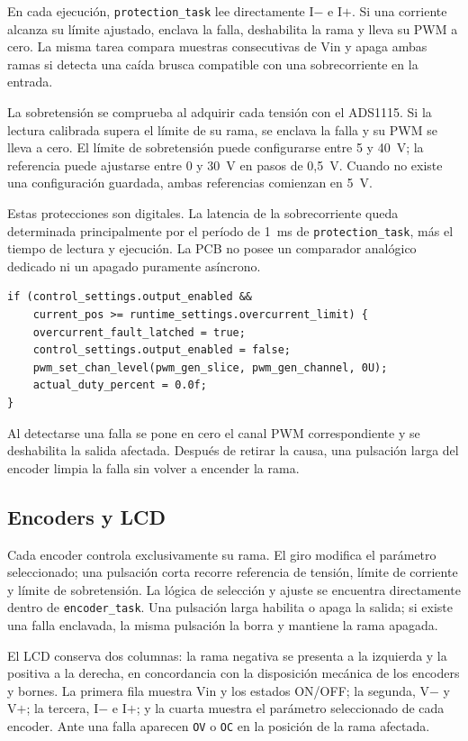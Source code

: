 \documentclass[conference]{IEEEtran}
\begin{document}
En cada ejecución, \texttt{protection\_task} lee directamente I$-$ e I$+$. Si una corriente alcanza su límite ajustado, enclava la falla, deshabilita la rama y lleva su PWM a cero. La misma tarea compara muestras consecutivas de Vin y apaga ambas ramas si detecta una caída brusca compatible con una sobrecorriente en la entrada.

La sobretensión se comprueba al adquirir cada tensión con el ADS1115. Si la lectura calibrada supera el límite de su rama, se enclava la falla y su PWM se lleva a cero. El límite de sobretensión puede configurarse entre 5 y 40~V; la referencia puede ajustarse entre 0 y 30~V en pasos de 0,5~V. Cuando no existe una configuración guardada, ambas referencias comienzan en 5~V.

Estas protecciones son digitales. La latencia de la sobrecorriente queda determinada principalmente por el período de 1~ms de \texttt{protection\_task}, más el tiempo de lectura y ejecución. La PCB no posee un comparador analógico dedicado ni un apagado puramente asíncrono.

\begin{lstlisting}[caption={Enclavamiento de sobrecorriente en la tarea de protección.}]
if (control_settings.output_enabled &&
    current_pos >= runtime_settings.overcurrent_limit) {
    overcurrent_fault_latched = true;
    control_settings.output_enabled = false;
    pwm_set_chan_level(pwm_gen_slice, pwm_gen_channel, 0U);
    actual_duty_percent = 0.0f;
}
\end{lstlisting}

Al detectarse una falla se pone en cero el canal PWM correspondiente y se deshabilita la salida afectada. Después de retirar la causa, una pulsación larga del encoder limpia la falla sin volver a encender la rama.

\subsection{Encoders y LCD}

Cada encoder controla exclusivamente su rama. El giro modifica el parámetro seleccionado; una pulsación corta recorre referencia de tensión, límite de corriente y límite de sobretensión. La lógica de selección y ajuste se encuentra directamente dentro de \texttt{encoder\_task}. Una pulsación larga habilita o apaga la salida; si existe una falla enclavada, la misma pulsación la borra y mantiene la rama apagada.

El LCD conserva dos columnas: la rama negativa se presenta a la izquierda y la positiva a la derecha, en concordancia con la disposición mecánica de los encoders y bornes. La primera fila muestra Vin y los estados ON/OFF; la segunda, V$-$ y V$+$; la tercera, I$-$ e I$+$; y la cuarta muestra el parámetro seleccionado de cada encoder. Ante una falla aparecen \texttt{OV} o \texttt{OC} en la posición de la rama afectada.
\end{document}
